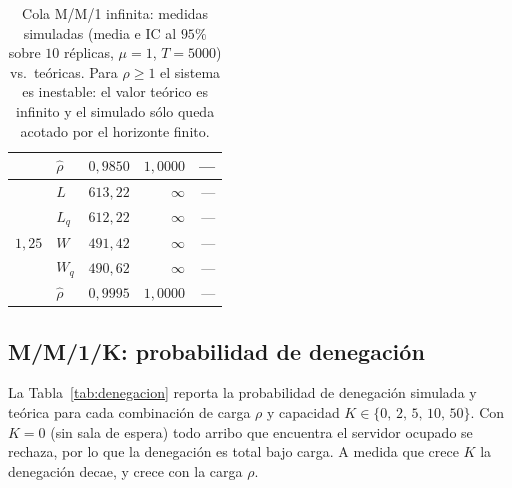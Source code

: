 \documentclass[11pt]{article}
\begin{document}
\begin{table}[H]
\begin{tabular}{llrrr}
 & $\hat{\rho}$  & $0{,}9850$ & $1{,}0000$ & --- \\
\midrule
\multirow{5}{*}{$1{,}25$}
 & $L$           & $613{,}22$ & $\infty$ & --- \\
 & $L_q$         & $612{,}22$ & $\infty$ & --- \\
 & $W$           & $491{,}42$ & $\infty$ & --- \\
 & $W_q$         & $490{,}62$ & $\infty$ & --- \\
 & $\hat{\rho}$  & $0{,}9995$ & $1{,}0000$ & --- \\
\bottomrule
\end{tabular}
\caption{Cola M/M/1 infinita: medidas simuladas (media e IC al $95\%$ sobre
$10$ r\'eplicas, $\mu = 1$, $T = 5000$) vs.\ te\'oricas. Para
$\rho \ge 1$ el sistema es inestable: el valor te\'orico es infinito y el
simulado s\'olo queda acotado por el horizonte finito.}
\label{tab:infinita}
\end{table}

\subsection{M/M/1/K: probabilidad de denegaci\'on}

La Tabla~\ref{tab:denegacion} reporta la probabilidad de denegaci\'on
simulada y te\'orica para cada combinaci\'on de carga $\rho$ y capacidad
$K \in \{0,\,2,\,5,\,10,\,50\}$. Con $K = 0$ (sin sala de espera) todo
arribo que encuentra el servidor ocupado se rechaza, por lo que la
denegaci\'on es total bajo carga. A medida que crece $K$ la denegaci\'on
decae, y crece con la carga $\rho$.
\end{document}
